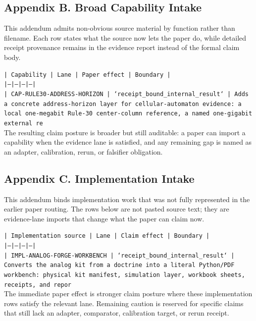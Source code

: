\documentclass[11pt]{article}
\begin{document}
\subsection*{Appendix B. Broad Capability Intake}

This addendum admits non-obvious source material by function rather than filename. Each row states what the source now lets the paper do, while detailed receipt provenance remains in the evidence report instead of the formal claim body.

\noindent\texttt{| Capability | Lane | Paper effect | Boundary |}\\
\noindent\texttt{|---|---|---|---|}\\
\noindent\texttt{| CAP-RULE30-ADDRESS-HORIZON | `receipt\_bound\_internal\_result` | Adds a concrete address-horizon layer for cellular-automaton evidence: a local one-megabit Rule-30 center-column reference, a named one-gigabit external re}\\

The resulting claim posture is broader but still auditable: a paper can import a capability when the evidence lane is satisfied, and any remaining gap is named as an adapter, calibration, rerun, or falsifier obligation.

\subsection*{Appendix C. Implementation Intake}

This addendum binds implementation work that was not fully represented in the earlier paper routing. The rows below are not pasted source text; they are evidence-lane imports that change what the paper can claim now.

\noindent\texttt{| Implementation source | Lane | Claim effect | Boundary |}\\
\noindent\texttt{|---|---|---|---|}\\
\noindent\texttt{| IMPL-ANALOG-FORGE-WORKBENCH | `receipt\_bound\_internal\_result` | Converts the analog kit from a doctrine into a literal Python/PDF workbench: physical kit manifest, simulation layer, workbook sheets, receipts, and repor}\\

The immediate paper effect is stronger claim posture where these implementation rows satisfy the relevant lane. Remaining caution is reserved for specific claims that still lack an adapter, comparator, calibration target, or rerun receipt.
\end{document}
